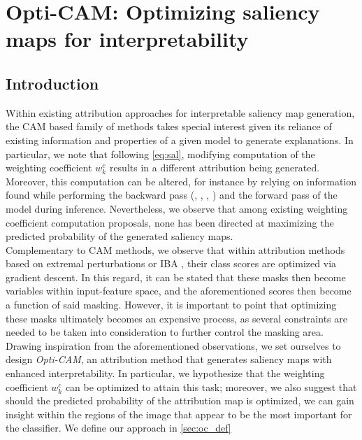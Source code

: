 \chapter{Opti-CAM: Optimizing saliency maps for interpretability}
\chaptertoc{}
\label{ch:opticam}
\section{Introduction}
\label{sec:oc_intro}
\noindent Within existing attribution approaches for interpretable saliency map generation, the CAM  
\autocite{zhou2016learning} based family of methods takes special interest given its reliance of
existing  information and properties of a given model to generate explanations. In particular, we 
note that following \autoref{eq:sal}, modifying computation of the weighting coefficient 
$w_k^c$ results in a different attribution being generated. Moreover, this computation can be 
altered, for instance by relying on information found while performing the backward pass 
(\cite{selvaraju2017grad}, \cite{chattopadhay2018grad}, \cite{axiombased}, 
\cite{smilkov2017smoothgrad}) and the forward pass \autocite{wang2020score} of the model during 
inference. Nevertheless, we observe that among existing weighting coefficient computation 
proposals, none has been directed at maximizing the predicted probability of the generated 
 saliency maps.\\

\noindent Complementary to CAM methods, we observe that within attribution methods based on 
extremal perturbations \autocite{fong2019understanding} or IBA \autocite{schulz2020restricting}, 
their class scores are optimized via gradient descent. In this regard, it can 
be stated that these masks then become variables within input-feature space, and the aforementioned 
scores then become a function of said masking. However, it is important to point that optimizing 
these masks ultimately becomes an expensive process, as several constraints are needed 
to be taken into consideration to further control the masking area.\\

\noindent Drawing inspiration from the aforementioned observations, we set ourselves to design 
\emph{Opti-CAM}, an attribution method that generates saliency maps with enhanced interpretability. 
In particular, we hypothesize that the weighting coefficient $w_k^c$ can be optimized to attain 
this task; moreover, we also suggest that should the predicted probability of the attribution map 
is optimized, we can gain insight within the regions of the image that appear to be the most 
important for the classifier. We define our approach in \autoref{sec:oc_def}\\


